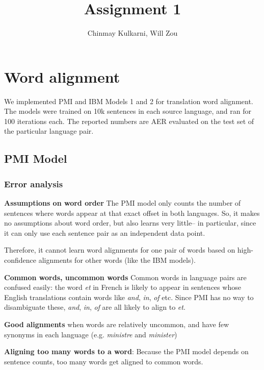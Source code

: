 \documentclass[letterpaper]{article}
\author{Chinmay Kulkarni, Will Zou}
\title{Assignment 1}
\begin{document}
\maketitle

\section{Word alignment}
We implemented PMI and IBM Models 1 and 2 for translation word alignment. The models were trained on 10k sentences in each source language, and ran for 100 iterations each. The reported numbers are AER evaluated on the test set of the particular language pair. 
\subsection{PMI Model}
\subsubsection{Error analysis} %
\label{ssub:error_analysis}

\textbf{Assumptions on word order} The PMI model only counts the number of sentences where words appear at that exact offset in both languages. So, it makes no assumptions about word order, but also learns very little-- in particular, since it can only use each sentence pair as an independent data point. 

Therefore, it cannot learn word alignments for one pair of words based on high-confidence alignments for other words (like the IBM models).

\textbf{Common words, uncommon words} Common words in language pairs are confused easily: the word \textit{et} in French is likely to appear in sentences whose English translations contain words like \textit{and}, \textit{in}, \textit{of} etc. Since PMI has no way to disambiguate these,  \textit{and}, \textit{in}, \textit{of} are all likely to align to \textit{et}.

\textbf{Good alignments} when words are relatively uncommon, and have few synonyms in each language (e.g. \textit{ministre} and \textit{minister})

\textbf{Aligning too many words to a word}: Because the PMI model depends on sentence counts, too many words get aligned to common words.
\end{document}
